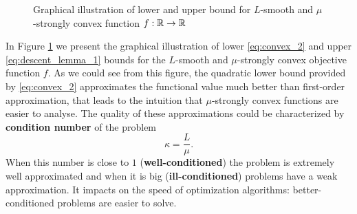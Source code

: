 \begin{figure}[H]
\centering

\caption{Graphical illustration of lower and upper bound for $L$-smooth and $\mu$-strongly convex function $f:\mathbb{R}\rightarrow \mathbb{R}$}
\label{fig:functional_approximations}
\end{figure}

In Figure \ref{fig:functional_approximations} we present the graphical illustration of lower \eqref{eq:convex_2} and upper \eqref{eq:descent_lemma_1} bounds for the $L$-smooth and $\mu$-strongly convex objective function $f$. {As we could see from this figure, the quadratic lower bound provided by \eqref{eq:convex_2} approximates the functional value much better than first-order approximation, that leads to the intuition that $\mu$-strongly convex functions are easier to analyse.} The quality of these approximations could be characterized by {\textbf{condition number}} of the problem
$$
\kappa =  \frac{L}{\mu}.
$$
When this number is close to $1$ ({\textbf{well-conditioned}}) the problem is extremely well approximated and when it is big ({\textbf{ill-conditioned}}) problems have a weak approximation. It impacts on the speed of optimization algorithms: better-conditioned problems are easier to solve.

